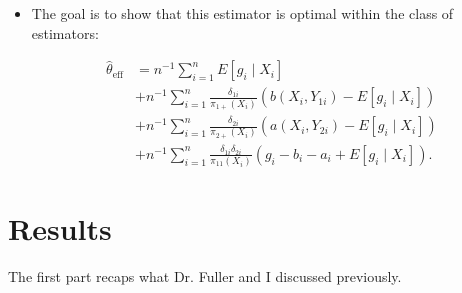 \documentclass[12pt]{article}
\begin{document}
\begin{itemize}
  \item The goal is to show that this estimator is optimal within the class
    of estimators:

    \begin{align}\label{eq:propclass}
    \hat \theta_{\text{eff}} 
    &= n^{-1} \sum_{i = 1}^n E[g_i \mid X_i]\nonumber \\ 
    &+ n^{-1} \sum_{i = 1}^n \frac{\delta_{1i}}{\pi_{1+}(X_i)}
      (b(X_i, Y_{1i}) - E[g_i \mid X_i])\nonumber \\ 
    &+ n^{-1} \sum_{i = 1}^n \frac{\delta_{2i}}{\pi_{2+}(X_i)}
      (a(X_i, Y_{2i}) - E[g_i \mid X_i])\nonumber \\ 
    &+ n^{-1} \sum_{i = 1}^n \frac{\delta_{1i} \delta_{2i}}{\pi_{11}(X_i)}
      (g_i - b_i - a_i + E[g_i \mid X_i]).
    \end{align}

\end{itemize}

\section*{Results}

The first part recaps what Dr. Fuller and I discussed previously.
\end{document}
